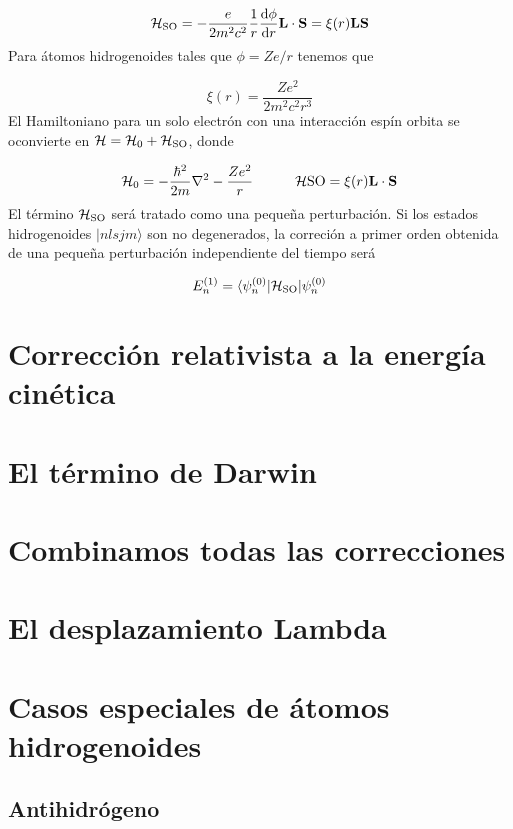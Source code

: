 \begin{equation}
    \mathcal{H}_{\text{SO}} =  - \frac{e}{2m^2c^2} \frac{1}{r} \frac{\mathrm{d} \phi}{\mathrm{d} r}  \mathbf{L} \cdot \mathbf{S} = \xi  (r) \mathbf{L} \mathbf{S}
\end{equation}
Para átomos hidrogenoides tales que $\phi=Ze/r$ tenemos que

\begin{equation}
    \xi (r) = \frac{Ze^2}{2m^2c^2r^3}
\end{equation}
El Hamiltoniano para un solo electrón con una interacción espín orbita se oconvierte en $\mathcal{H}=\mathcal{H}_0+\mathcal{H}_{\text{SO}}$, donde 


\begin{equation}
\mathcal{H}_0 = - \frac{\hbar^2}{2m} \nabla^2 - \frac{Ze^2}{r} \quad \quad \quad \mathcal{H}{\text{SO}} = \xi(r) \mathbf{L} \cdot \mathbf{S}
\end{equation}
El término $\mathcal{H}_{\text{SO}}$ será tratado como una pequeña perturbación. Si los estados hidrogenoides $|nlsjm\rangle$ son no degenerados, la correción a primer orden obtenida de una pequeña perturbación independiente del tiempo será

\begin{equation}
    E_n^{(1)} = \langle \psi_n^{(0)} | \mathcal{H}_{\text{SO}}  | \psi_n^{(0)}
\end{equation}
 
\section{Corrección relativista a la energía cinética}

\section{El término de Darwin}

\section{Combinamos todas las correcciones}

\section{El desplazamiento Lambda}

\section{Casos especiales de átomos hidrogenoides}

\subsection{Antihidrógeno}
